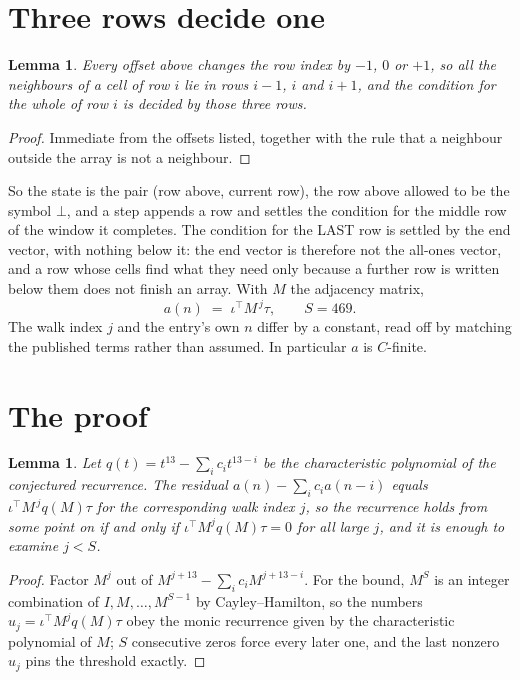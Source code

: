 \documentclass[11pt,a4paper]{article}
\theoremstyle{plain}
\newtheorem{lemma}[theorem]{Lemma}
\theoremstyle{definition}
\begin{document}
\section{Three rows decide one}

\begin{lemma}\label{lem:win}
Every offset above changes the row index by $-1$, $0$ or $+1$, so all the neighbours of a cell
of row $i$ lie in rows $i-1$, $i$ and $i+1$, and the condition for the whole of row $i$ is
decided by those three rows.
\end{lemma}

\begin{proof}
Immediate from the offsets listed, together with the rule that a neighbour outside the array is
not a neighbour.
\end{proof}

So the state is the pair (row above, current row), the row above allowed to be the symbol
$\bot$, and a step appends a row and settles the condition for the middle row of the window it
completes. The condition for the LAST row is settled by the end vector, with nothing below it:
the end vector is therefore not the all-ones vector, and a row whose cells find what they need
only because a further row is written below them does not finish an array. With $M$ the
adjacency matrix,
\[
a(n)\;=\;\iota^{\!\top}M^{\,j}\tau ,\qquad S=469.
\]
The walk index $j$ and the entry's own $n$ differ by a constant, read off by matching the
published terms rather than assumed. In particular $a$ is $C$-finite.

\section{The proof}

\begin{lemma}\label{lem:crit}
Let $q(t)=t^{13}-\sum_i c_it^{13-i}$ be the characteristic polynomial of the
conjectured recurrence. The residual $a(n)-\sum_ic_ia(n-i)$ equals
$\iota^{\!\top}M^{\,j}q(M)\tau$ for the corresponding walk index $j$, so the recurrence
holds from some point on if and only if $\iota^{\!\top}M^{j}q(M)\tau=0$ for all large $j$,
and it is enough to examine $j<S$.
\end{lemma}

\begin{proof}
Factor $M^{j}$ out of $M^{j+13}-\sum_ic_iM^{j+13-i}$. For the bound, $M^{S}$
is an integer combination of $I,M,\dots,M^{S-1}$ by Cayley--Hamilton, so the numbers
$u_j=\iota^{\!\top}M^{j}q(M)\tau$ obey the monic recurrence given by the characteristic
polynomial of $M$; $S$ consecutive zeros force every later one, and the last nonzero $u_j$
pins the threshold exactly.
\end{proof}
\end{document}
